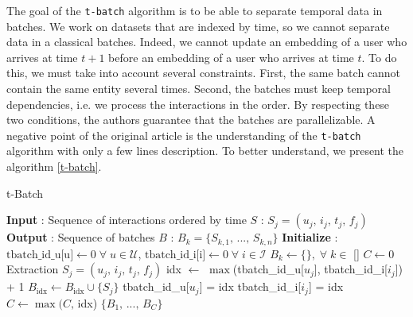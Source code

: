 The goal of the \texttt{t-batch} algorithm is to be able to separate temporal data in batches. We work on datasets that are indexed by time, so we cannot separate data in a classical batches. Indeed, we cannot update an embedding of a user who arrives at time $t+1$ before an embedding of a user who arrives at time $t$. To do this, we must take into account several constraints. First, the same batch cannot contain the same entity several times. Second, the batches must keep temporal dependencies, i.e. we process the interactions in the order. By respecting these two conditions, the authors guarantee that the batches are parallelizable. A negative point of the original article is the understanding of the \texttt{t-batch} algorithm with only a few lines description. To better understand, we present the algorithm \ref{t-batch}.



    \begin{algorithm}[H]
        \caption{t-Batch}
        \label{t-batch}
        \begin{algorithmic} 
            \STATE \textbf{Input} : Sequence of interactions ordered by time $S$ : $S_j = (u_j,\,i_j,\,t_j,\,f_j)$
            \STATE \textbf{Output} : Sequence of batches $B$ : $B_k = \{S_{k,1},\,...,\,S_{k,n} \}$
            \STATE \textbf{Initialize} : 
            \STATE \quad $\text{tbatch\_id\_u[u]} \leftarrow 0 \; \forall \; u \in \mathcal{U}$, \quad $\text{tbatch\_id\_i[i]} \leftarrow 0 \; \forall \; i \in \mathcal{I}$
            \STATE \quad $B_k \leftarrow \{ \},\; \forall \; k \in$ [\!]
            \STATE \quad $C \leftarrow 0$
                \STATE Extraction $S_j = (u_j,\,i_j,\,t_j,\,f_j)$
                \STATE idx $\leftarrow$ $\max$(tbatch\_id\_u[$u_j$], tbatch\_id\_i[$i_j$]) + 1
                \STATE $B_\text{idx} \leftarrow B_\text{idx} \cup \{ S_j \}$
                \STATE tbatch\_id\_u[$u_j$] = idx
                \STATE tbatch\_id\_i[$i_j$] = idx
                \STATE $C \leftarrow \max(C,\,$idx)
            \ENDFOR
            \RETURN $\{ B_1,\,...,\,B_C \}$
        \end{algorithmic}
    \end{algorithm}


